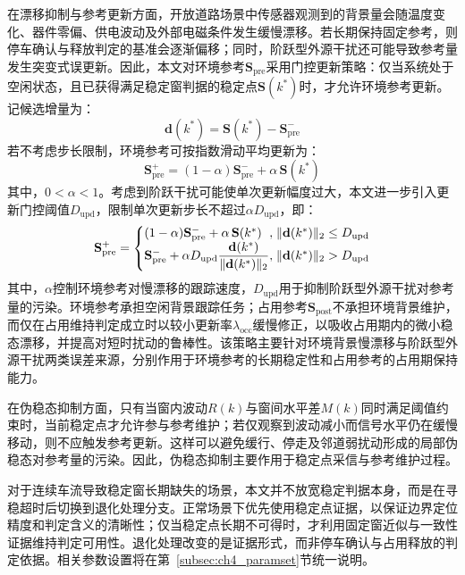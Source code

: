 \documentclass{xdupgthesis}
\begin{document}
在漂移抑制与参考更新方面，开放道路场景中传感器观测到的背景量会随温度变化、器件零偏、供电波动及外部电磁条件发生缓慢漂移。若长期保持固定参考，则停车确认与释放判定的基准会逐渐偏移；同时，阶跃型外源干扰还可能导致参考量发生突变式误更新\cite{ch4_zhang2020railway}。因此，本文对环境参考$\mathbf{S}_{\mathrm{pre}}$采用门控更新策略：仅当系统处于空闲状态，且已获得满足稳定窗判据的稳定点$\mathbf{S}(k^\ast)$时，才允许环境参考更新。记候选增量为：
\begin{equation}
    \mathbf{d}(k^\ast)=\mathbf{S}(k^\ast)-\mathbf{S}_{\mathrm{pre}}^{-}
\end{equation}
若不考虑步长限制，环境参考可按指数滑动平均更新为：
\begin{equation}
    \mathbf{S}_{\mathrm{pre}}^{+}=(1-\alpha)\mathbf{S}_{\mathrm{pre}}^{-}+\alpha\,\mathbf{S}(k^\ast)
\end{equation}
其中，$0<\alpha<1$。考虑到阶跃干扰可能使单次更新幅度过大，本文进一步引入更新门控阈值$D_{\mathrm{upd}}$，限制单次更新步长不超过$\alpha D_{\mathrm{upd}}$，即：
\begin{equation}
    \mathbf{S}_{\mathrm{pre}}^{+}=
    \left\{
    \begin{array}{@{}l@{,\;}l@{}}
        (1-\alpha)\mathbf{S}_{\mathrm{pre}}^{-}+\alpha\,\mathbf{S}(k^\ast)
        & \lVert\mathbf{d}(k^\ast)\rVert_2\le D_{\mathrm{upd}}\\
        \mathbf{S}_{\mathrm{pre}}^{-}+\alpha D_{\mathrm{upd}}\dfrac{\mathbf{d}(k^\ast)}{\lVert\mathbf{d}(k^\ast)\rVert_2}
        & \lVert\mathbf{d}(k^\ast)\rVert_2>D_{\mathrm{upd}}
    \end{array}
    \right.
\end{equation}
其中，$\alpha$控制环境参考对慢漂移的跟踪速度，$D_{\mathrm{upd}}$用于抑制阶跃型外源干扰对参考量的污染。环境参考承担空闲背景跟踪任务；占用参考$\mathbf{S}_{\mathrm{post}}$不承担环境背景维护，而仅在占用维持判定成立时以较小更新率$\lambda_{\mathrm{occ}}$缓慢修正，以吸收占用期内的微小稳态漂移，并提高对短时扰动的鲁棒性。该策略主要针对环境背景慢漂移与阶跃型外源干扰两类误差来源，分别作用于环境参考的长期稳定性和占用参考的占用期保持能力。

在伪稳态抑制方面，只有当窗内波动$R(k)$与窗间水平差$M(k)$同时满足阈值约束时，当前稳定点才允许参与参考维护；若仅观察到波动减小而信号水平仍在缓慢移动，则不应触发参考更新。这样可以避免缓行、停走及邻道弱扰动形成的局部伪稳态对参考量的污染。因此，伪稳态抑制主要作用于稳定点采信与参考维护过程。

对于连续车流导致稳定窗长期缺失的场景，本文并不放宽稳定判据本身，而是在寻稳超时后切换到退化处理分支。正常场景下优先使用稳定点证据，以保证边界定位精度和判定含义的清晰性；仅当稳定点长期不可得时，才利用固定窗近似与一致性证据维持判定可用性。退化处理改变的是证据形式，而非停车确认与占用释放的判定依据。相关参数设置将在第~\ref{subsec:ch4_paramset}节统一说明。
\end{document}
